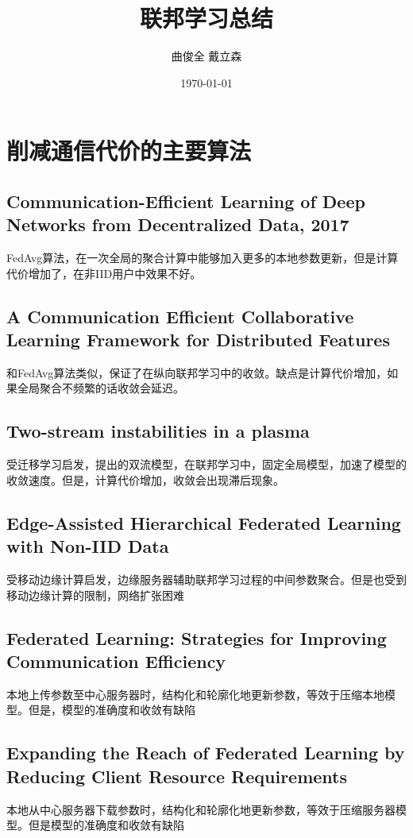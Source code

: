 \documentclass[12pt, a4paper]{article}
\title{
    联邦学习总结
}
\author{
    曲俊全 戴立森
}
\date{
    \today
}
\begin{document}
    \maketitle
    \section*{削减通信代价的主要算法}
        \subsection*{Communication-Efficient Learning of Deep Networks from Decentralized Data\cite{mcmahan2017communicationefficient}, 2017}
            FedAvg算法，在一次全局的聚合计算中能够加入更多的本地参数更新，但是计算代价增加了，在非IID用户中效果不好。
        \subsection*{A Communication Efficient Collaborative Learning Framework for Distributed Features\cite{liu2020communication}}
            和FedAvg算法类似，保证了在纵向联邦学习中的收敛。缺点是计算代价增加，如果全局聚合不频繁的话收敛会延迟。
        \subsection*{Two-stream instabilities in a plasma\cite{1965AuJPh..18..271K}}
            受迁移学习启发，提出的双流模型，在联邦学习中，固定全局模型，加速了模型的收敛速度。但是，计算代价增加，收敛会出现滞后现象。
        \subsection*{Edge-Assisted Hierarchical Federated Learning with Non-IID Data\cite{unknown}}
            受移动边缘计算启发，边缘服务器辅助联邦学习过程的中间参数聚合。但是也受到移动边缘计算的限制，网络扩张困难
        \subsection*{Federated Learning: Strategies for Improving Communication Efficiency\cite{45648}}
            本地上传参数至中心服务器时，结构化和轮廓化地更新参数，等效于压缩本地模型。但是，模型的准确度和收敛有缺陷        
        \subsection*{Expanding the Reach of Federated Learning by Reducing Client Resource Requirements\cite{caldas2019expanding}}
            本地从中心服务器下载参数时，结构化和轮廓化地更新参数，等效于压缩服务器模型。但是模型的准确度和收敛有缺陷
\end{document}
